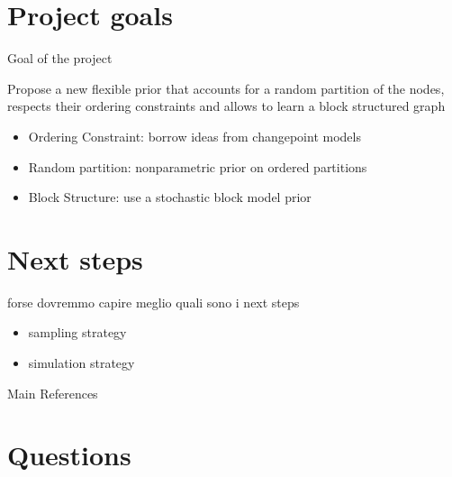 \section{Project goals}


\begin{frame}[containsverbatim]{Goal of the project}

Propose a \alert {new flexible prior that accounts for a random partition of the nodes}, respects their ordering constraints and allows to learn a block structured graph

 \begin{itemize}
     \item Ordering Constraint: borrow ideas from changepoint models
     \item Random partition: nonparametric prior on ordered partitions
     \item Block Structure: use a stochastic block model prior
 \end{itemize}



\end{frame}

\section{Next steps}
\begin{frame}

forse dovremmo capire meglio quali sono i next steps

\begin{itemize}
    \item sampling strategy
    \item simulation strategy
\end{itemize}



\centering \Huge 
\end{frame}





\begin{frame}{Main References}
       \nocite{*}
        
        
\end{frame}

\section*{Questions}


